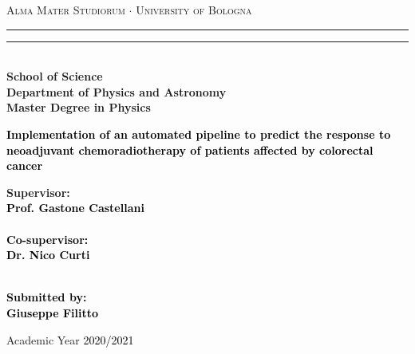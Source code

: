 \begin{titlepage}
    \begin{center}
    {{\Large{\textsc{Alma Mater Studiorum $\cdot$ University of  Bologna}}}} 
    \rule[0.1cm]{15.8cm}{0.1mm}
    \rule[0.5cm]{15.8cm}{0.6mm}
    \\\vspace{3mm}
    {\small{\bf School of Science \\
    Department of Physics and Astronomy\\
    Master Degree in Physics}}
    \end{center}
    
    \vspace{23mm}
    
    \begin{center}\textcolor{black}{
    {\Large{\bf Implementation of an automated pipeline to predict the response to neoadjuvant chemoradiotherapy of patients affected by colorectal cancer}}
    }\end{center}
    
    \vspace{50mm} \par \noindent
    
    \begin{minipage}[t]{0.47\textwidth}
    {\large{\bf Supervisor: \vspace{2mm}\\\textcolor{black}{
    Prof. Gastone Castellani}\\\\
    \textcolor{black}{
    \bf Co-supervisor: \vspace{2mm}\\Dr. Nico Curti\\\\}}}
    \end{minipage}
    \hfill
    \begin{minipage}[t]{0.47\textwidth}\raggedleft \textcolor{black}{
    {\large{\bf Submitted by:
    \vspace{2mm}\\
    \textcolor{black}{
    Giuseppe Filitto}}}
    }
    \end{minipage}
    
    \vspace{27mm}
    
    \begin{center}
    Academic Year \textcolor{black}{ 2020/2021}
    \end{center}
    
    \end{titlepage}